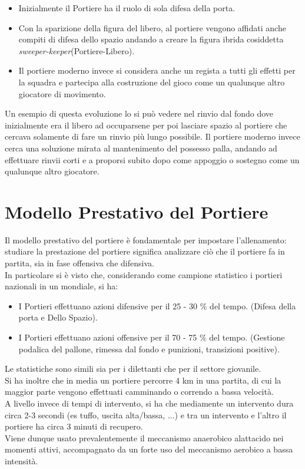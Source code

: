 \documentclass[../uefaC.tex]{subfiles}
\begin{document}
\begin{itemize}
    \item Inizialmente il Portiere ha il ruolo di sola difesa della porta.
    \item Con la sparizione della figura del libero, al portiere vengono affidati anche compiti di difesa dello spazio andando a creare la figura ibrida cosiddetta \emph{sweeper-keeper}(Portiere-Libero).
    \item Il portiere moderno invece si considera anche un regista a tutti gli effetti per la squadra e partecipa alla costruzione del gioco come un qualunque altro giocatore di movimento.
\end{itemize}
Un esempio di questa evoluzione lo si può vedere nel rinvio dal fondo dove inizialmente era il libero ad occuparsene per poi lasciare spazio al portiere che cercava solamente di fare un rinvio più lungo possibile. Il portiere moderno invece cerca una soluzione mirata al mantenimento del possesso palla, andando ad effettuare rinvii corti e a proporsi subito dopo come appoggio o sostegno come un qualunque altro giocatore.


\section{Modello Prestativo del Portiere}
Il modello prestativo del portiere è fondamentale per impostare l’allenamento: studiare la prestazione del portiere significa analizzare ciò che il portiere fa in partita, sia in fase offensiva che difensiva. \hfill \\
In particolare si è visto che, considerando come campione statistico i portieri nazionali in un mondiale, si ha:
\begin{itemize}
    \item I Portieri effettuano azioni difensive per il 25 - 30 \% del tempo. (Difesa della porta e Dello Spazio).
    \item I Portieri effettuano azioni offensive per il 70 - 75 \% del tempo. (Gestione podalica del pallone, rimessa dal fondo e punizioni, transizioni positive).
\end{itemize}
Le statistiche sono simili sia per i dilettanti che per il settore giovanile. \hfill \\
Si ha inoltre che in media un portiere percorre 4 km in una partita, di cui la maggior parte vengono effettuati camminando o correndo a bassa velocità. \hfill \\
A livello invece di tempi di intervento, si ha che mediamente un intervento dura circa 2-3 secondi (es tuffo, uscita alta/bassa, ...) e tra un intervento e l'altro il portiere ha circa 3 minuti di recupero. \hfill \\
Viene dunque usato prevalentemente il meccanismo anaerobico alattacido nei momenti attivi, accompagnato da un forte uso del meccanismo aerobico a bassa intensità.
\end{document}
